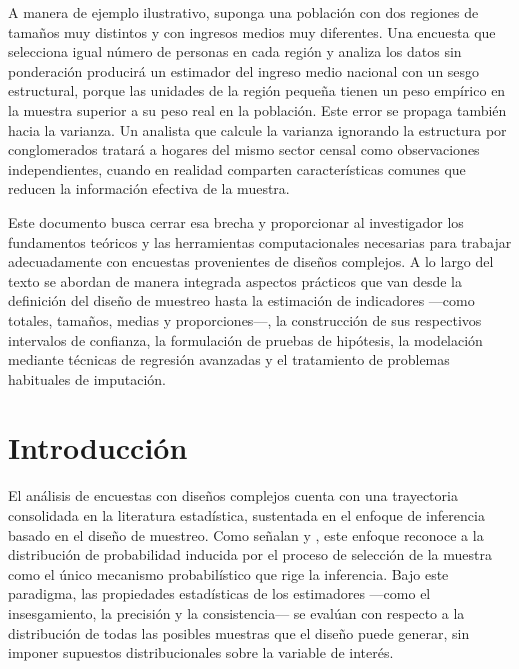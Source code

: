 \documentclass[
  spanish,
  12pt,
]{book}
\begin{document}
A manera de ejemplo ilustrativo, suponga una población con dos regiones de tamaños muy distintos y con ingresos medios muy diferentes. Una encuesta que selecciona igual número de personas en cada región y analiza los datos sin ponderación producirá un estimador del ingreso medio nacional con un sesgo estructural, porque las unidades de la región pequeña tienen un peso empírico en la muestra superior a su peso real en la población. Este error se propaga también hacia la varianza. Un analista que calcule la varianza ignorando la estructura por conglomerados tratará a hogares del mismo sector censal como observaciones independientes, cuando en realidad comparten características comunes que reducen la información efectiva de la muestra.

Este documento busca cerrar esa brecha y proporcionar al investigador los fundamentos teóricos y las herramientas computacionales necesarias para trabajar adecuadamente con encuestas provenientes de diseños complejos. A lo largo del texto se abordan de manera integrada aspectos prácticos que van desde la definición del diseño de muestreo hasta la estimación de indicadores ---como totales, tamaños, medias y proporciones---, la construcción de sus respectivos intervalos de confianza, la formulación de pruebas de hipótesis, la modelación mediante técnicas de regresión avanzadas y el tratamiento de problemas habituales de imputación.

\chapter{Introducción}\label{cap-intro}

El análisis de encuestas con diseños complejos cuenta con una trayectoria consolidada en la literatura estadística, sustentada en el enfoque de inferencia basado en el diseño de muestreo. Como señalan \citet{sarndal2003model} y \citet{Gutierrez2016}, este enfoque reconoce a la distribución de probabilidad inducida por el proceso de selección de la muestra como el único mecanismo probabilístico que rige la inferencia. Bajo este paradigma, las propiedades estadísticas de los estimadores ---como el insesgamiento, la precisión y la consistencia--- se evalúan con respecto a la distribución de todas las posibles muestras que el diseño puede generar, sin imponer supuestos distribucionales sobre la variable de interés.
\end{document}
